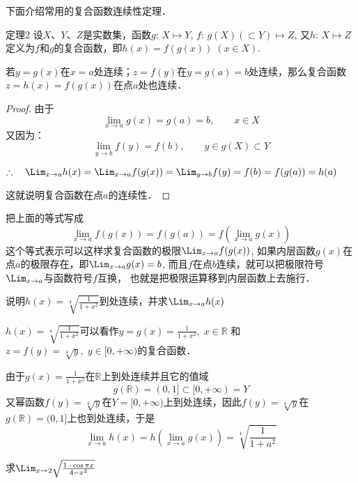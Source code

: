 下面介绍常用的复合函数连续性定理．
\begin{blk}
{定理2} 设$X$、$Y$、$Z$是实数集，函数$g:\,X\mapsto Y$, $f:\, g(X)(\subset Y)\mapsto Z$, 又$h:\, X\mapsto Z$定义为$f$和$g$的复合函数，即$h(x)=f (g (x) )\;  (x\in X)$.

若$y=g(x)$在$x=a$处连续；$z=f(y)$在$y=g(a)=b$处连续，那么复合函数$z=h(x)=f(g(x))$在点$a$处也连续．
\end{blk}

\begin{proof}
由于
\begin{equation}
    \lim_{x\to a} g(x)=g(a)=b,\qquad x\in X
\end{equation}    
又因为：
\begin{equation}
    \lim_{y\to b} f(y)=f(b),\qquad y\in g(X)\subset Y
\end{equation}

$\therefore\quad \Lim_{x\to a}h(x)=\Lim_{x\to a}f(g(x))=\Lim_{y\to b}f(y)=f(b)=f(g(a))=h(a)$

这就说明复合函数在点$a$的连续性．
\end{proof}

把上面的等式写成
\[\lim_{x\to a}f (g (x) ) =f (g (a) ) =f \left(\lim_{x\to a} g(x) \right)\]
这个等式表示可以这样求复合函数的极限$\Lim_{x\to a}f(g(x))$, 
如果内层函数$g(x)$在点$a$的极限存在，即$\Lim_{x\to a}g(x)=b$, 
而且$f$在点$b$连续，就可以把极限符号$\Lim_{x\to a}$与函数符号$f$互换，
也就是把极限运算移到内层函数上去施行．

\begin{example}
    说明$h(x)=\sqrt[4]{\frac{1}{1+x^2}}$到处连续，并求$\Lim_{x\to a}h(x)$
\end{example}

\begin{solution}
    $h(x)=\sqrt[4]{\frac{1}{1+x^2}}$可以看作$y=g(x)=\frac{1}{1+x^2},\; x\in\mathbb{R}$
和$z=f(y)=\sqrt[4]{y},\; y\in [0,+\infty)$的复合函数．

由于$g(x)=\frac{1}{1+x^2}$在$\mathbb{R}$上到处连续并且它的值域
\[g(\mathbb{R})=(0,1]\subset [0,+\infty)=Y\]
又幂函数$f(y)=\sqrt[4]{y}$在$Y=[0,+\infty)$上到处连续，因此$f(y)=\sqrt[4]{y}$在$g(\mathbb{R})=(0,1]$上也到处连续，于是
\[\lim_{x\to a}h(x)=h\left(\lim_{x\to a}g(x)\right)=\sqrt[4]{\frac{1}{1+a^2}}\]
\end{solution}


\begin{example}
    求$\Lim_{x\to 2}\sqrt{\frac{1-\cos\pi x}{4-x^2}}$
\end{example}

